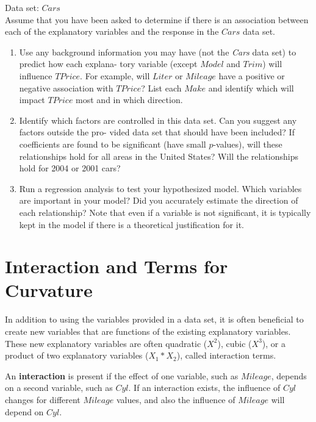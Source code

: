 \documentclass[
]{report}
\begin{document}
Data set: \(Cars\)\\
Assume that you have been asked to determine if there is an association between each of the explanatory
variables and the response in the \(Cars\) data set.

\begin{enumerate}
\def\labelenumi{\arabic{enumi}.}
\setcounter{enumi}{31}
\item
  Use any background information you may have (not the \emph{Cars} data set) to predict how each explana-
  tory variable (except \(Model\) and \(Trim\)) will influence \(TPrice\). For example, will \(Liter\) or \(Mileage\)
  have a positive or negative association with \(TPrice\)? List each \(Make\) and identify which will impact
  \(TPrice\) most and in which direction.
\item
  Identify which factors are controlled in this data set. Can you suggest any factors outside the pro-
  vided data set that should have been included? If coefficients are found to be significant (have small
  \(p\)-values), will these relationships hold for all areas in the United States? Will the relationships hold for 2004 or 2001 cars?
\item
  Run a regression analysis to test your hypothesized model. Which variables are important in your model? Did you accurately estimate the direction of each relationship? Note that even if a variable is not significant, it is typically kept in the model if there is a theoretical justification
  for it.
\end{enumerate}

\section{\texorpdfstring{\textbf{Interaction and Terms for Curvature}}{Interaction and Terms for Curvature}}\label{interaction-and-terms-for-curvature}

In addition to using the variables provided in a data set, it is often beneficial to create new variables that are functions of the existing explanatory variables. These new explanatory variables are often quadratic (\(X^2\)), cubic (\(X^3\)), or a product of two explanatory variables (\(X_1*X_2\)), called interaction terms.

An \textbf{interaction} is present if the effect of one variable, such as \(Mileage\), depends on a second variable, such as \(Cyl\). If an interaction exists, the influence of \(Cyl\) changes for different \(Mileage\) values, and also the influence of \(Mileage\) will depend on \(Cyl\).
\end{document}
